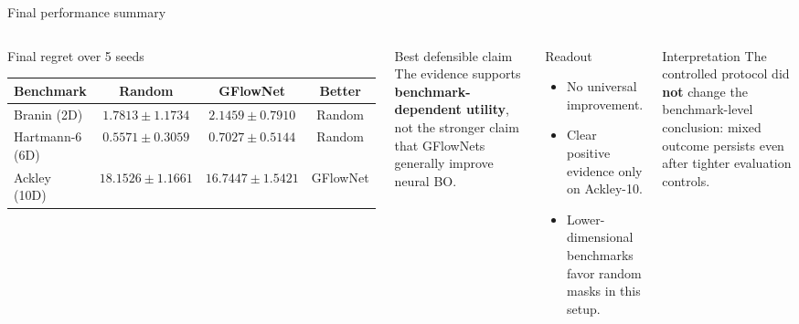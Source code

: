 \documentclass[aspectratio=169]{beamer}
\begin{document}
\begin{frame}{Final performance summary}
\vspace{-0.55em}
\begin{columns}[T,onlytextwidth]
\begin{minipage}[t][0.82\textheight]{\linewidth}\vspace{0pt}
  \begin{cardA}{Final regret over 5 seeds}
  \centering
  \begin{tabular}{lccc}
  \toprule
  Benchmark & Random & GFlowNet & Better \\
  \midrule
  Branin (2D) & $1.7813 \pm 1.1734$ & $2.1459 \pm 0.7910$ & Random \\
  Hartmann-6 (6D) & $0.5571 \pm 0.3059$ & $0.7027 \pm 0.5144$ & Random \\
  Ackley (10D) & $18.1526 \pm 1.1661$ & $16.7447 \pm 1.5421$ & GFlowNet \\
  \bottomrule
  \end{tabular}
  \end{cardA}

  \vfill

  \begin{cardG}{Best defensible claim}
  The evidence supports \textbf{benchmark-dependent utility}, not the stronger claim that GFlowNets generally improve neural BO.
  \end{cardG}
\end{minipage}

\begin{minipage}[t][0.82\textheight]{\linewidth}\vspace{0pt}
  \begin{card}{Readout}
  \begin{itemize}
    \item No universal improvement.
    \item Clear positive evidence only on Ackley-10.
    \item Lower-dimensional benchmarks favor random masks in this setup.
  \end{itemize}
  \end{card}

  \vfill

  \begin{cardW}{Interpretation}
  The controlled protocol did \textbf{not} change the benchmark-level conclusion: mixed outcome persists even after tighter evaluation controls.
  \end{cardW}
\end{minipage}
\end{columns}
\end{frame}
\end{document}
